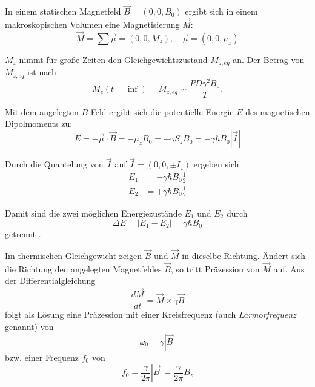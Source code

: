 In einem statischen Magnetfeld $\vec{B}=(0,0,B_0)$ ergibt sich in einem makroskopischen Volumen eine Magnetisierung $\vec{M}$:
\begin{equation}
	\vec{M} = \sum \vec{\mu} = (0,0,M_z), \quad \vec{\mu}=(0,0,\mu_z)
\end{equation}

$M_z$ nimmt für große Zeiten den Gleichgewichtszustand $M_{z,eq}$ an. Der Betrag von $M_{z,eq}$ ist nach \cite[S.~47]{Bushong2014}
\begin{equation}
	M_z(t=\inf) = M_{z,eq} \sim \frac{PD \gamma^2 B_0}{T}.
\end{equation}

Mit dem angelegten $B$-Feld ergibt sich die potentielle Energie $E$ des magnetischen Dipolmoments zu:
\begin{equation}
	E=-\vec{\mu} \cdot \vec{B} = -\mu_z B_0 = -\gamma S_z B_0 = -\gamma \hbar B_0 |\vec{I}|
\end{equation}

Durch die Quantelung von $\vec{I}$ auf $\vec{I}=(0,0,\pm I_z)$ ergeben sich:
\begin{subequations}
	\begin{align}
	E_1 & = -\gamma \hbar B_0 \frac{1}{2} \\
	E_2 & = +\gamma \hbar B_0 \frac{1}{2}
	\end{align}
\end{subequations}

Damit sind die zwei möglichen Energiezustände $E_1$ und $E_2$ durch
\begin{equation}
	\Delta E = |E_1 - E_2| = \gamma \hbar B_0
\end{equation}
getrennt \cite[S.~ 56]{Nishimura1996}.

Im thermischen Gleichgewicht zeigen $\vec{B}$ und $\vec{M}$ in dieselbe Richtung. Ändert sich die Richtung den angelegten Magnetfeldes $\vec{B}$, so tritt Präzession von $\vec{M}$ auf. Aus der Differentialgleichung
\begin{equation}
\label{eq:Mdgl}
	\frac{d\vec{M}}{dt}=\vec{M} \times \gamma \vec{B}
\end{equation}
folgt als Lösung eine Präzession mit einer Kreisfrequenz (auch \textit{Larmorfrequenz} genannt) von
\begin{equation}
	\omega_0=\gamma |\vec{B}|
\end{equation}
bzw. einer Frequenz $f_0$ von
\begin{equation}
	f_0=\frac{\gamma}{2\pi} |\vec{B}| = \frac{\gamma}{2\pi} B_z
\end{equation}

